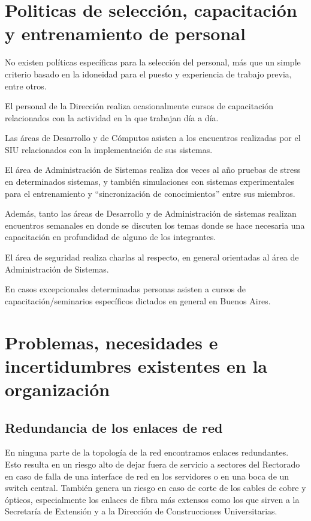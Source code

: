 \documentclass[a4paper,11pt,oneside]{article}
\begin{document}
\section{Politicas de selección, capacitación y entrenamiento de personal}
%
No existen políticas específicas para la selección del personal, más
que un simple criterio basado en la idoneidad para el puesto y
experiencia de trabajo previa, entre otros.

El personal de la Dirección realiza ocasionalmente cursos de
capacitación relacionados con la actividad en la que trabajan día a
día.

Las áreas de Desarrollo y de Cómputos asisten a los encuentros
realizadas por el SIU relacionados con la implementación de sus
sistemas.

El área de Administración de Sistemas realiza dos veces al año pruebas
de stress en determinados sistemas, y también simulaciones con
sistemas experimentales para el entrenamiento y ``sincronización de
conocimientos'' entre sus miembros.

Además, tanto las áreas de Desarrollo y de Administración de sistemas
realizan encuentros semanales en donde se discuten los temas donde se
hace necesaria una capacitación en profundidad de alguno de los
integrantes.

El área de seguridad realiza charlas al respecto, en general
orientadas al área de Administración de Sistemas.

En casos excepcionales determinadas personas asisten a cursos de
capacitación/seminarios específicos dictados en general en Buenos
Aires.
%
\newpage
\section{Problemas, necesidades e incertidumbres existentes en la organización}
%
\subsection*{Redundancia de los enlaces de red}
En ninguna parte de la topología de la red encontramos enlaces
redundantes. Esto resulta en un riesgo alto de dejar fuera de servicio
a sectores del Rectorado en caso de falla de una interface de red en
los servidores o en una boca de un switch central. También genera un
riesgo en caso de corte de los cables de cobre y ópticos,
especialmente los enlaces de fibra más extensos como los que sirven a
la Secretaría de Extensión y a la Dirección de Construcciones
Universitarias.
\end{document}
